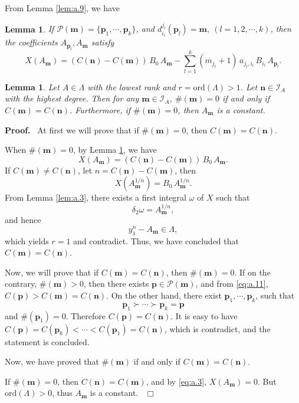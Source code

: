 \documentclass[preprint, 12pt]{elsarticle}
\newtheorem{lem}[thm]{Lemma}
\numberwithin{equation}{section}
\newenvironment{proof}[1][Proof]{\textbf{#1.}\ }{\ $\Box$}
\begin{document}
From Lemma \ref{lem:a.9}, we have
\begin{lem}
\label{lem:a.8} If $\mathcal{P}(\mathbf{m}) = \{\mathbf{p}_1,\cdots,
\mathbf{p}_k\}$, and $d_{i_l}^{j_l}(\mathbf{p}_l) = \mathbf{m},\
(l = 1,2,\cdots,k)$, then the coefficients $A_{\mathbf{p}_l},
A_{\mathbf{m}}$ satisfy
\begin{equation}
\label{eq:a.3} X(A_{\mathbf{m}}) = (C({\mathbf{n}}) -
C({\mathbf{m}}))\,B_0\,A_{\mathbf{m}} -\sum_{l = 1}^k
(m_{j_l}+1)\,a_{j_l,i_l}\,B_{i_l}\,A_{\mathbf{p}_l}.
\end{equation}
\end{lem}

\begin{lem}
\label{lem:a.10}Let $A\in \Lambda$ with the lowest rank and $r =
\mathrm{ord}(\Lambda) > 1$. Let $\mathbf{n}\in \mathcal{I}_A$ with the highest
degree. Then for any $\mathbf{m}\in \mathcal{I}_A$, $\#(\mathbf{m})=0$ if
and only if $C(\mathbf{m}) = C(\mathbf{n})$. Furthermore, if
$\#(\mathbf{m})=0$, then $A_{\mathbf{m}}$ is a constant.
\end{lem}
\begin{proof} At first we will prove that if $\#(\mathbf{m}) = 0$, then $C(\mathbf{m}) = C(\mathbf{n})$.

When $\#(\mathbf{m}) = 0$,  by Lemma \ref{lem:a.8}, we have
$$X(A_{\mathbf{m}}) = (C({\mathbf{n}}) -
C({\mathbf{m}}))\,B_0\,A_{\mathbf{m}}.$$ 
If
$C({\mathbf{m}})\not=C({\mathbf{n}})$, let $n = C(\mathbf{n}) -
C(\mathbf{m})$, then
$$X(A_{\mathbf{m}}^{1/n})
 = B_0\,A_{\mathbf{m}}^{1/n}.$$
 From Lemma \ref{lem:a.3}, there exists a first integral
 $\omega$ of $X$ such that
 $$\delta_2\omega = A_{\mathbf{m}}^{1/n},$$
 and hence
 $$y_1^{n} - A_{\mathbf{m}}\in \Lambda,$$
 which yields $r = 1$ and contradict. Thus, we have concluded that $C(\mathbf{m}) =
 C(\mathbf{n})$.

Now, we will prove that if $C(\mathbf{m}) = C(\mathbf{n})$, then
$\#(\mathbf{m}) = 0$. If on the contrary,
 $\#(\mathbf{m})>0$, then there exists $\mathbf{p}\in
 \mathcal{P}(\mathbf{m})$, and from \eqref{eq:a.11}, $C(\mathbf{p}) > C(\mathbf{m}) =
 C(\mathbf{n})$. On the other hand, there exist $\mathbf{p}_1, \cdots, \mathbf{p}_k$, such that
$$\mathbf{p}_1 \succ \cdots \succ \mathbf{p}_k = \mathbf{p}$$
and $\#(\mathbf{p}_1) = 0$. Therefore $C(\mathbf{p}) = C(\mathbf{n})$. It is easy to have $C(\mathbf{p})
 = C(\mathbf{p}_k) <\cdots < C(\mathbf{p}_{1}) = C(\mathbf{n})$,
which is contradict, and the statement is concluded.

Now, we have  proved that $\#(\mathbf{m})$ if and only if $C(\mathbf{m}) = C(\mathbf{n})$.

If $\#(\mathbf{m}) = 0$, then $C(\mathbf{n}) = C(\mathbf{m})$, and
by \eqref{eq:a.3}, $X(A_{\mathbf{m}}) = 0$. But
$\mathrm{ord}(\Lambda)
> 0$, thus $A_{\mathbf{m}}$ is a constant.
\end{proof}
\end{document}
